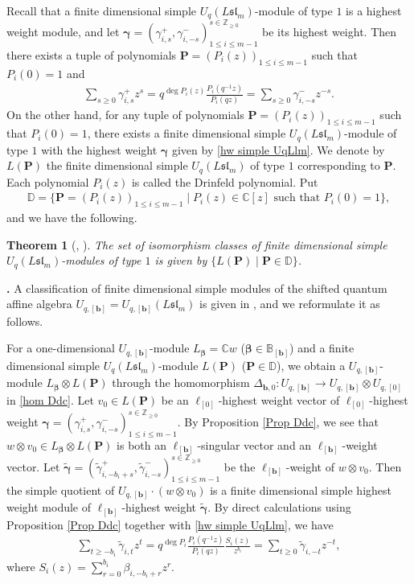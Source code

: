 \documentclass[12pt]{amsart}
\newtheorem{thm}{Theorem}[section]
\def \para{\refstepcounter{thm} \par\medskip\noindent
                \textbf{\thethm .} }
\numberwithin{equation}{thm}
\newcommand\BB{\mathbb B}
\newcommand\CC{\mathbb C}
\newcommand\DD{\mathbb D}
\newcommand\ZZ{\mathbb Z}
\newcommand\bP{\mathbf P}
\newcommand\bb{\mathbf b}
\renewcommand\b{\beta}   %
\newcommand\g{\gamma}
\newcommand\D{\Delta}
\newcommand\Bb{\boldsymbol\beta}
\newcommand\Bg{\boldsymbol\gamma}
\newcommand\wt{\widetilde}
\newcommand\ra{\rightarrow}
\newcommand\Fsl{\mathfrak{sl}}
\newcounter{ni}
\begin{document}
Recall that a finite dimensional simple $U_q (L\Fsl_m)$-module of type $1$ is a highest weight module, and 
let $\Bg =(\g_{i, s}^+, \g_{i, -s}^-)^{s \in \ZZ_{\geq 0}}_{1 \leq i \leq m-1}$ be its highest weight.  
Then there exists a tuple of polynomials $\bP = (P_i (z))_{1 \leq i \leq m-1} $ such that 
$P_i(0)=1$ and 
\begin{align}
\label{hw simple UqLlm} 
\sum_{s \geq 0 } \g_{i,s}^+ z^s = q^{\deg P_i(z)} \frac{P_i(q^{-1} z)}{P_i(qz)} = \sum_{s \geq 0} \g_{i, -s}^- z^{-s}. 
\end{align}
On the other hand, 
for any tuple of polynomials $\bP = (P_i (z))_{1 \leq i \leq m-1} $ such that $P_i(0)=1$, 
there exists a finite dimensional simple $U_q (L\Fsl_m)$-module of type $1$ with the highest weight $\Bg$ given by 
\eqref{hw simple UqLlm}. 
We denote by $L(\bP)$ the finite dimensional simple $U_q (L\Fsl_m)$ of type $1$ corresponding to $\bP$. 
Each polynomial $P_i(z)$ is called the Drinfeld polynomial. 
Put 
\begin{align*}
\DD = \{ \bP = (P_i(z))_{1 \leq i \leq m-1} \mid P_i(z) \in \CC [z] \text{ such that } P_i(0) =1\}, 
\end{align*}
and we have the following. 

\begin{thm}[{\cite{CP91},  \cite{CP95}}]  
The set of isomorphism classes of finite dimensional simple $U_q (L\Fsl_m)$-modules of type $1$ is given by 
$\{L(\bP) \mid \bP \in \DD\}$. 
\end{thm}

\para 
\label{simple Uqb}
A classification of finite dimensional simple modules of the shifted quantum affine algebra $U_{q,[\bb]}=U_{q,[\bb]}(L\Fsl_m)$ 
is given in \cite{Her23}, and we reformulate it as follows. 

For a one-dimensional $U_{q,[\bb]}$-module $L_{\Bb} = \CC w$ ($\Bb \in \BB_{[\bb]}$) 
and a finite dimensional simple $U_q (L\Fsl_m)$-module $L(\bP)$ ($\bP \in \DD$), 
we obtain a $U_{q,[\bb]}$-module $L_{\Bb} \otimes L(\bP)$ through the homomorphism 
$\D_{\bb,0} : U_{q,[\bb]} \ra U_{q,[\bb]} \otimes U_{q,[0]}$ in \eqref{hom Ddc}. 
Let $v_0 \in L(\bP)$ be an $\ell_{[0]}$-highest weight vector of $\ell_{[0]}$-highest weight 
$\Bg = (\g_{i,s}^+, \g_{i,-s}^-)^{s \in \ZZ_{\geq 0}}_{1 \leq i \leq m-1}$. 
By Proposition \ref{Prop Ddc}, we see that 
$w \otimes v_0 \in L_{\Bb} \otimes L(\bP)$ is both an $\ell_{[\bb]}$-singular vector and  an $\ell_{[\bb]}$-weight vector. 
Let $\wt{\Bg} = (\wt{\g}_{i, - b_i +s}^+, \wt{\g}_{i, -s}^-)^{s \in \ZZ_{\geq 0}}_{1 \leq i \leq m-1}$ 
be the $\ell_{[\bb]}$-weight of $w \otimes v_0$. 
Then the simple quotient of $U_{q,[\bb]} \cdot (w \otimes v_0)$ 
is a finite dimensional simple highest weight module of $\ell_{[\bb]}$-highest weight $\wt{\Bg}$. 
By direct calculations using Proposition \ref{Prop Ddc} together with \eqref{hw simple UqLlm}, 
we have 
\begin{align}
\label{hw simple Uqb}
\sum_{ t \geq - b_i} \wt{\g}_{i,t} z^t 
= q^{\deg P_i} \frac{P_i(q^{-1} z)}{P_i(qz)} \frac{S_i(z)}{z^{b_i}} 
= \sum_{t \geq 0} \wt{\g}_{i, -t} z^{-t},  
\end{align}
where 
$S_i(z) = \sum_{r=0}^{b_i} \b_{i, - b_i +r} z^r$.
\end{document}
